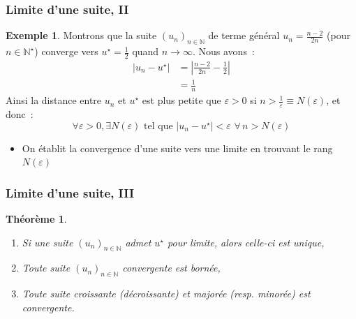 \documentclass[10pt,notheorems]{beamer}
\theoremstyle{plain}
\newtheorem{theorem}{Théorème}
\theoremstyle{definition} %
\newtheorem{example}{Exemple}
\begin{document}
\begin{frame}
  \frametitle{Limite d'une suite, II}

  \bigskip

  \begin{example}
    Montrons que la suite $(u_n)_{n\in\mathbb N}$ de terme général $u_n = \frac{n-2}{2n}$ (pour $n\in\mathbb N^{\star}$) converge vers $u^{\star} = \frac{1}{2}$ quand $n\rightarrow\infty$. Nous avons~:
    \[
      \begin{split}
        |u_n-u^{\star}| &= \left|\frac{n-2}{2n}-\frac{1}{2}\right|\\
        &= \frac{1}{n}
      \end{split}
    \]
    Ainsi la distance entre $u_n$ et $u^{\star}$ est plus petite que $\varepsilon>0$ si $n>\frac{1}{\varepsilon}\equiv N(\varepsilon)$, et donc~:
    \[
      \forall \varepsilon>0, \exists N(\varepsilon) \text{ tel que } |u_n-u^{\star}|<\varepsilon\,\, \forall \, n>N(\varepsilon)
    \]
  \end{example}

  \bigskip

  \begin{itemize}

  \item On établit la convergence d'une suite vers une limite en trouvant le rang $N(\varepsilon)$

  \end{itemize}

\end{frame}


\begin{frame}
  \frametitle{Limite d'une suite, III}

  \begin{theorem}
    \medskip
    \begin{enumerate}

    \item Si une suite $(u_n)_{n\in\mathbb N}$ admet $u^{\star}$ pour limite, alors celle-ci est unique,\newline

    \item Toute suite $(u_n)_{n\in\mathbb N}$ convergente est bornée,\newline

    \item Toute suite croissante (décroissante) et majorée (resp. minorée) est convergente.\newline

    \end{enumerate}
  \end{theorem}

\end{frame}
\end{document}
